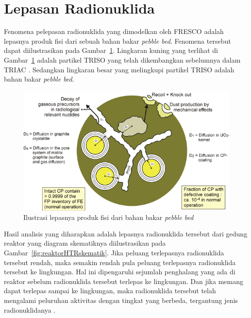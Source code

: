 \documentclass[a4paper,11pt]{report}
\renewcommand{\figurename}{Gambar}
\begin{document}
\section{Lepasan Radionuklida}
Fenomena pelepasan radionuklida yang dimodelkan oleh FRESCO adalah lepasnya produk fisi dari sebuah bahan bakar \textit{pebble bed}. Fenomena tersebut dapat diilustrasikan pada \figurename~\ref{fig:produkFisiLepas}. Lingkaran kuning yang terlihat di \figurename~\ref{fig:produkFisiLepas} adalah partikel TRISO yang telah dikembangkan sebelumnya dalam TRIAC \cite{triac1}. Sedangkan lingkaran besar yang melingkupi partikel TRISO adalah bahan bakar \textit{pebble bed}.

\begin{figure}[h!]
  \begin{center}
    \includegraphics[scale=.5]{pics/ilustrasiLepas.png}
    \caption{Ilustrasi lepasnya produk fisi dari bahan bakar \textit{pebble bed} \cite{report2}}
    \label{fig:produkFisiLepas}
  \end{center}
\end{figure}

Hasil analisis yang diharapkan adalah lepasnya radionuklida tersebut dari gedung reaktor yang diagram skematiknya diilustrasikan pada \figurename~\ref{fig:reaktorHTRskematik}. Jika peluang terlepasnya radionuklida tersebut rendah, maka semakin rendah pula peluang terlepasnya radionuklida tersebut ke lingkungan. Hal ini dipengaruhi sejumlah penghalang yang ada di reaktor sebelum radionuklida tersebut terlepas ke lingkungan. Dan jika memang dapat terlepas sampai ke lingkungan, maka radionuklida tersebut telah mengalami peluruhan aktivitas dengan tingkat yang berbeda, tergantung jenis radionuklidanya \cite{report3}.
\end{document}
